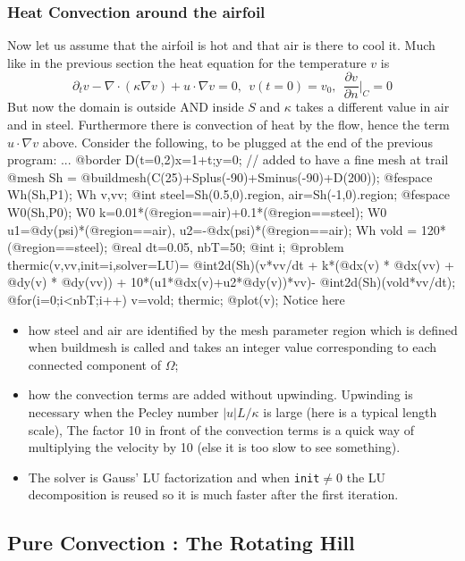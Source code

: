 \documentclass[a4paper,twoside,12pt]{book}
\def\p{\partial}
\def\n{\nabla}
\begin{document}
 \subsubsection{Heat Convection around the airfoil}
Now let us assume that the airfoil is hot and that air is there to cool it.
Much like in the previous section the heat equation for the temperature $v$ is
$$
\p_t v -\n\cdot(\kappa\n v) + u\cdot\n v =0,~~v(t=0)=v_0, ~~\frac{\p v}{\p n}|_C=0
$$
But now the domain is outside AND inside $S$ and $\kappa$ takes a different value in air
and in steel.  Furthermore there is convection of heat by the flow, hence the
term $u\cdot\n v$ above.  Consider the following, to be plugged at the end of the previous program:
\bFF
...
@border D(t=0,2){x=1+t;y=0;} // added to have a fine mesh at trail
@mesh Sh = @buildmesh(C(25)+Splus(-90)+Sminus(-90)+D(200));
@fespace Wh(Sh,P1); Wh v,vv;
@int steel=Sh(0.5,0).region, air=Sh(-1,0).region;
@fespace W0(Sh,P0);
W0 k=0.01*(@region==air)+0.1*(@region==steel);
W0 u1=@dy(psi)*(@region==air), u2=-@dx(psi)*(@region==air);
Wh vold = 120*(@region==steel);
@real dt=0.05, nbT=50;
@int i;
@problem thermic(v,vv,init=i,solver=LU)= @int2d(Sh)(v*vv/dt
                + k*(@dx(v) * @dx(vv) + @dy(v) * @dy(vv))
                + 10*(u1*@dx(v)+u2*@dy(v))*vv)- @int2d(Sh)(vold*vv/dt);
@for(i=0;i<nbT;i++){
    v=vold; thermic;
 @plot(v);
}
\eFF
Notice here
\begin{itemize}
\item how steel and air are identified by the mesh parameter region which is defined when buildmesh is
called and takes an integer value corresponding to each connected component of $\Omega$;

\item how the convection terms are added without upwinding. Upwinding is necessary when the
Pecley number $|u|L/\kappa$ is large (here is a typical length scale), The factor 10 in front of
the convection terms is a quick way of multiplying the velocity by 10 (else it is too slow to see something).

\item The solver is Gauss' LU factorization and when {\tt init}$\neq 0$ the LU decomposition is reused so it
is much faster after the first iteration.
\end{itemize}

\subsection{Pure Convection : The Rotating Hill}
\end{document}
